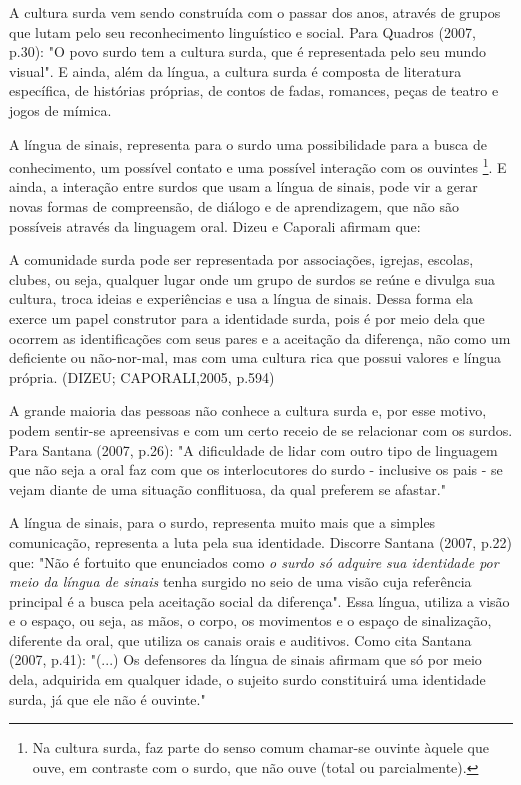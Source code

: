 \documentclass[brasil]{abnt}
\begin{document}
		A cultura surda vem sendo construída com o passar dos anos, através de grupos que lutam pelo seu reconhecimento linguístico e social. 
		Para Quadros (2007, p.30): "O povo surdo tem a cultura surda, que é representada pelo seu mundo visual". E ainda, além da língua, a cultura surda é composta de literatura 
		específica, de histórias próprias, de contos de fadas, romances, peças de teatro e jogos de mímica.
		
		A língua de sinais, representa para o surdo uma possibilidade para a busca de conhecimento, um possível contato e uma possível interação com os ouvintes
		\footnote{Na cultura surda, faz parte do senso comum chamar-se ouvinte àquele que ouve, em contraste com o surdo, que não ouve (total ou parcialmente).}.
		E ainda, a interação entre surdos que usam a língua de sinais, pode vir a gerar novas formas de compreensão, de diálogo e de aprendizagem, que não são possíveis através da linguagem oral.
		Dizeu e Caporali afirmam que:
		
			\begin{citacao}A comunidade surda pode ser representada por associações, igrejas, escolas, clubes, ou seja, qualquer lugar onde um grupo de surdos se reúne e divulga sua cultura, troca ideias e 
							experiências e usa a língua de sinais. Dessa forma ela exerce um papel construtor para a identidade surda, pois é por meio dela que ocorrem as identificações com seus pares e a 
							aceitação da diferença, não como um deficiente ou não-nor-mal, mas com uma cultura rica que possui valores e língua própria. (DIZEU; CAPORALI,2005, p.594)
			\end{citacao}
			
		A grande maioria das pessoas não conhece a cultura surda e, 
		por esse motivo, podem sentir-se apreensivas e com um certo receio de 
		se relacionar com os surdos. Para Santana (2007, p.26): "A dificuldade de lidar 
		com outro tipo de linguagem que não seja a oral faz com que os interlocutores do surdo - inclusive os pais - se vejam diante de uma situação conflituosa, da qual preferem se afastar."		
		
		A língua de sinais, para o surdo, representa muito mais que a 
		simples comunicação, representa a luta pela sua identidade. 
		Discorre Santana (2007, p.22) que: "Não é fortuito que enunciados como 
		\textit{o surdo só adquire sua identidade por meio da língua de sinais} tenha surgido no seio de uma visão cuja referência principal é a busca pela aceitação social da diferença". Essa língua, 
		utiliza a visão e o espaço, ou seja, as mãos, o corpo, os 
		movimentos e o espaço de sinalização, diferente da oral, que 
		utiliza os canais orais e auditivos. Como cita Santana (2007, 
		p.41): "(...) Os 
		defensores da língua de sinais afirmam que só por meio dela, adquirida em qualquer idade, o sujeito surdo constituirá uma identidade surda, já que ele não é ouvinte."
			
\end{document}
